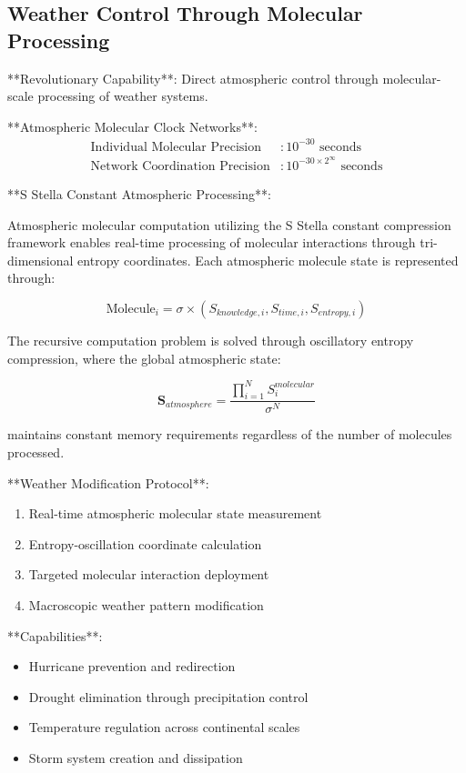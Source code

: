 \documentclass[12pt,a4paper]{article}
\theoremstyle{remark}
\begin{document}
\subsection{Weather Control Through Molecular Processing}

**Revolutionary Capability**: Direct atmospheric control through molecular-scale processing of weather systems.

**Atmospheric Molecular Clock Networks**:
\begin{align}
\text{Individual Molecular Precision} &: 10^{-30} \text{ seconds} \\
\text{Network Coordination Precision} &: 10^{-30 \times 2^{\infty}} \text{ seconds}
\end{align}

**S Stella Constant Atmospheric Processing**:

Atmospheric molecular computation utilizing the S Stella constant compression framework enables real-time processing of molecular interactions through tri-dimensional entropy coordinates. Each atmospheric molecule state is represented through:

\begin{equation}
\text{Molecule}_{i} = \sigma \times (S_{knowledge,i}, S_{time,i}, S_{entropy,i})
\end{equation}

The recursive computation problem is solved through oscillatory entropy compression, where the global atmospheric state:

\begin{equation}
\mathbf{S}_{atmosphere} = \frac{\prod_{i=1}^{N} S_i^{molecular}}{\sigma^N}
\end{equation}

maintains constant memory requirements regardless of the number of molecules processed.

**Weather Modification Protocol**:
\begin{enumerate}
\item Real-time atmospheric molecular state measurement
\item Entropy-oscillation coordinate calculation
\item Targeted molecular interaction deployment
\item Macroscopic weather pattern modification
\end{enumerate}

**Capabilities**:
\begin{itemize}
\item Hurricane prevention and redirection
\item Drought elimination through precipitation control
\item Temperature regulation across continental scales
\item Storm system creation and dissipation
\end{itemize}
\end{document}
